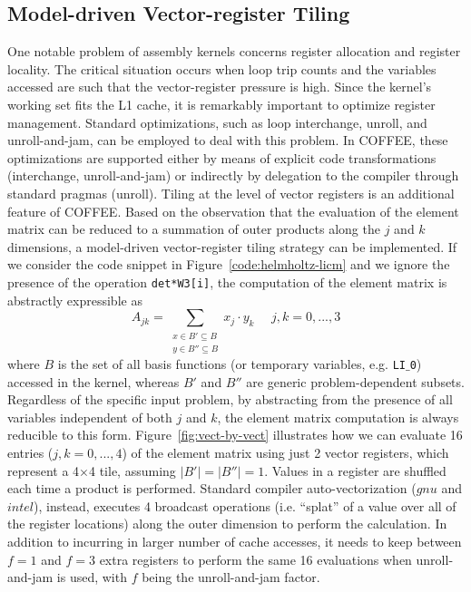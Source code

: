 \documentclass[conference]{IEEEtran}
\begin{document}
\subsection{Model-driven Vector-register Tiling}
One notable problem of assembly kernels concerns register allocation and register locality. The critical situation occurs when loop trip counts and the variables accessed are such that the vector-register pressure is high. Since the kernel's working set fits the L1 cache, it is remarkably important to optimize register management. Standard optimizations, such as loop interchange, unroll, and unroll-and-jam, can be employed to deal with this problem. In COFFEE, these optimizations are supported either by means of explicit code transformations (interchange, unroll-and-jam) or indirectly by delegation to the compiler through standard pragmas (unroll). Tiling at the level of vector registers is an additional feature of COFFEE. Based on the observation that the evaluation of the element matrix can be reduced to a summation of outer products along the $j$ and $k$ dimensions, a model-driven vector-register tiling strategy can be implemented. If we consider the code snippet in Figure~\ref{code:helmholtz-licm} and we ignore the presence of the operation \texttt{det*W3[i]}, the computation of the element matrix is abstractly expressible as
\begin{equation}
\label{outer-product}
A_{jk} = \sum_{\substack{
  x \in B' \subseteq B \\
  y \in B'' \subseteq B}}
x_j\cdot y_k ~~~~~~ j,k = 0,...,3
\end{equation}
where $B$ is the set of all basis functions (or temporary variables, e.g. \texttt{LI$\_$0}) accessed in the kernel, whereas $B'$ and $B''$ are generic problem-dependent subsets. Regardless of the specific input problem, by abstracting from the presence of all variables independent of both $j$ and $k$, the element matrix computation is always reducible to this form. Figure~\ref{fig:vect-by-vect} illustrates how we can evaluate 16 entries ($j,k=0,...,4$) of the element matrix using just 2 vector registers, which represent a 4$\times$4 tile, assuming $\vert B' \vert = \vert B'' \vert = 1$. Values in a register are shuffled each time a product is performed. Standard compiler auto-vectorization ($gnu$ and $intel$), instead, executes 4 broadcast operations (i.e. ``splat'' of a value over all of the register locations) along the outer dimension to perform the calculation. In addition to incurring in larger number of cache accesses, it needs to keep between $f=1$ and $f=3$ extra registers to perform the same 16 evaluations when unroll-and-jam is used, with $f$ being the unroll-and-jam factor.
\end{document}
